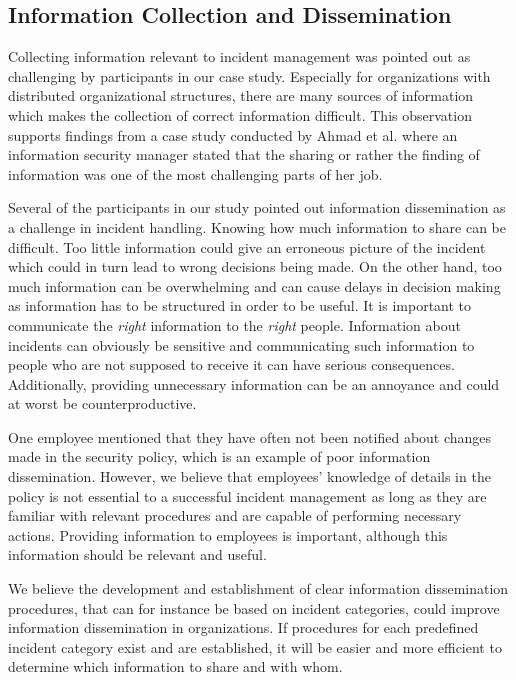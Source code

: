 \subsection{Information Collection and Dissemination}
Collecting information relevant to incident management was pointed out as challenging by participants in our case study. Especially for organizations with distributed organizational structures, there are many sources of information which makes the collection of correct information difficult. This observation supports findings from a case study conducted by Ahmad et al.\cite{ahmad2012incident} where an information security manager stated that the sharing or rather the finding of information was one of the most challenging parts of her job. 

Several of the participants in our study pointed out information dissemination as a challenge in incident handling. Knowing how much information to share can be difficult. Too little information could give an erroneous picture of the incident which could in turn lead to wrong decisions being made. On the other hand, too much information can be overwhelming and can cause delays in decision making as information has to be structured in order to be useful. It is important to communicate the \textit{right} information to the \textit{right} people. Information about incidents can obviously be sensitive and communicating such information to people who are not supposed to receive it can have serious consequences. Additionally, providing unnecessary information can be an annoyance and could at worst be counterproductive.

One employee mentioned that they have often not been notified about changes made in the security policy, which is an example of poor information dissemination. However, we believe that employees' knowledge of details in the policy is not essential to a successful incident management as long as they are familiar with relevant procedures and are capable of performing necessary actions. Providing information to employees is important, although this information should be relevant and useful.

We believe the development and establishment of clear information dissemination procedures, that can for instance be based on incident categories, could improve information dissemination in organizations. If procedures for each predefined incident category exist and are established, it will be easier and more efficient to determine which information to share and with whom.

